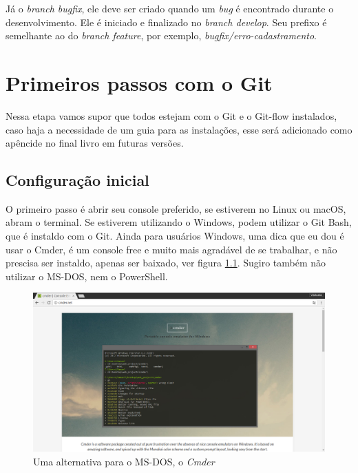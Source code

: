 \documentclass[12pt,openright,oneside,a4paper,english,brazil]{abntex2}
\begin{document}
Já o \textit{branch bugfix}, ele deve ser criado quando um \textit{bug} é encontrado durante o desenvolvimento. Ele é iniciado e finalizado no \textit{branch develop}. Seu prefixo é semelhante ao do \textit{branch feature}, por exemplo, \textit{bugfix/erro-cadastramento}.

\chapter{Primeiros passos com o Git}

Nessa etapa vamos supor que todos estejam com o Git e o Git-flow instalados, caso haja a necessidade de um guia para as instalações, esse será adicionado como apêncide no final livro em futuras versões.

\section{Configuração inicial \label{configinicial}}

O primeiro passo é abrir seu console preferido, se estiverem no Linux ou macOS, abram o terminal. Se estiverem utilizando o Windows, podem utilizar o Git Bash, que é instaldo com o Git. Ainda para usuários Windows, uma dica que eu dou é usar o Cmder, é um console free e muito mais agradável de se trabalhar, e não prescisa ser instaldo, apenas ser baixado, ver figura \ref{cmder}. Sugiro também não utilizar o MS-DOS, nem o PowerShell.

\begin{figure}[h]
	\caption{\label{cmder}Uma alternativa para o MS-DOS, o \textit{Cmder}}
	\begin{center}
		\includegraphics[width=1\linewidth]{cmder}
	\end{center}
\end{figure}
\end{document}
